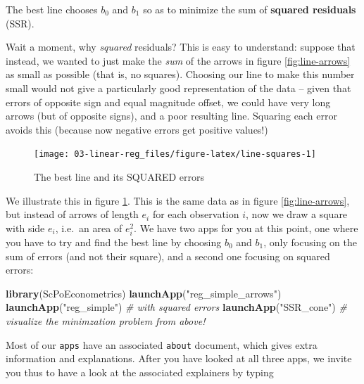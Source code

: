 \documentclass[]{book}
\newenvironment{Shaded}{\begin{snugshade}}{\end{snugshade}}
\newcommand{\KeywordTok}[1]{\textcolor[rgb]{0.13,0.29,0.53}{\textbf{#1}}}
\newcommand{\StringTok}[1]{\textcolor[rgb]{0.31,0.60,0.02}{#1}}
\newcommand{\CommentTok}[1]{\textcolor[rgb]{0.56,0.35,0.01}{\textit{#1}}}
\newcommand{\NormalTok}[1]{#1}
\newenvironment{warning}{\begin{tcolorbox}[colback=orange!5!white,colframe=orange]}{\end{tcolorbox}}
\begin{document}
\begin{warning}
The best line chooses \(b_0\) and \(b_1\) so as to minimize the sum of
\textbf{squared residuals} (SSR).
\end{warning}

 Wait a moment, why \emph{squared} residuals? This is easy to
understand: suppose that instead, we wanted to just make the \emph{sum}
of the arrows in figure \ref{fig:line-arrows} as small as possible (that
is, no squares). Choosing our line to make this number small would not
give a particularly good representation of the data -- given that errors
of opposite sign and equal magnitude offset, we could have very long
arrows (but of opposite signs), and a poor resulting line. Squaring each
error avoids this (because now negative errors get positive values!)

\begin{figure}

{\centering \texttt{[image: 03-linear-reg\_files/figure-latex/line-squares-1]} 

}

\caption{The best line and its SQUARED errors}\label{fig:line-squares}
\end{figure}

We illustrate this in figure \ref{fig:line-squares}. This is the same
data as in figure \ref{fig:line-arrows}, but instead of arrows of length
\(e_i\) for each observation \(i\), now we draw a square with side
\(e_i\), i.e.~an area of \(e_i^2\). We have two apps for you at this
point, one where you have to try and find the best line by choosing
\(b_0\) and \(b_1\), only focusing on the sum of errors (and not their
square), and a second one focusing on squared errors:

\begin{Shaded}
\begin{Highlighting}[]
\KeywordTok{library}\NormalTok{(ScPoEconometrics)}
\KeywordTok{launchApp}\NormalTok{(}\StringTok{"reg_simple_arrows"}\NormalTok{)}
\KeywordTok{launchApp}\NormalTok{(}\StringTok{"reg_simple"}\NormalTok{) }\CommentTok{# with squared errors}
\KeywordTok{launchApp}\NormalTok{(}\StringTok{"SSR_cone"}\NormalTok{) }\CommentTok{# visualize the minimzation problem from above!}
\end{Highlighting}
\end{Shaded}

Most of our \texttt{apps} have an associated \texttt{about} document,
which gives extra information and explanations. After you have looked at
all three apps, we invite you thus to have a look at the associated
explainers by typing
\end{document}
